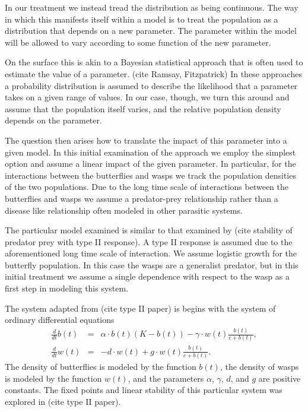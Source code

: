 \documentclass[12pt]{article}
\begin{document}
In our treatment we instead tread the distribution as being
continuous. The way in which this manifests itself within a model is
to treat the population as a distribution that depends on a new
parameter. The parameter within the model will be allowed to vary
according to some function of the new parameter.

On the surface this is akin to a Bayesian statistical approach that is
often used to estimate the value of a parameter. (cite Ramsay,
Fitzpatrick) In these approaches a probability distribution is assumed
to describe the likelihood that a parameter takes on a given range of
values. In our case, though, we turn this around and assume that the
population itself varies, and the relative population density depends
on the parameter.

The question then arises how to translate the impact of this parameter
into a given model. In this initial examination of the approach we
employ the simplest option and assume a linear impact of the given
parameter. In particular, for the interactions between the butterflies
and wasps we track the population densities of the two
populations. Due to the long time scale of interactions between the
butterflies and wasps we assume a predator-prey relationship rather
than a disease like relationship often modeled in other parasitic
systems.

The particular model examined is similar to that examined by (cite
stability of predator prey with type II response). A type II response
is assumed due to the aforementioned long time scale of
interaction. We assume logistic growth for the butterfly
population. In this case the wasps are a generalist predator, but in
this initial treatment we assume a single dependence with respect to
the wasp as a first step in modeling this system.

The system adapted from (cite type II paper) is begins with the system
of ordinary differential equations
\begin{eqnarray}
  \label{eq:initialSystem1}
  \frac{d}{dt} b(t) & = & \alpha \cdot b(t) (K - b(t)) - \gamma \cdot w(t) \frac{b(t)}{c+b(t)}, \\
  \label{eq:initialSystem2}
  \frac{d}{dt} w(t) & = & -d \cdot w(t) + g \cdot w(t) \frac{b(t)}{c+b(t)}.
\end{eqnarray}
The density of butterflies is modeled by the function $b(t)$, the
density of wasps is modeled by the function $w(t)$, and the parameters
$\alpha$, $\gamma$, $d$, and $g$ are positive constants. The fixed
points and linear stability of this particular system was explored in
(cite type II paper). 
\end{document}
